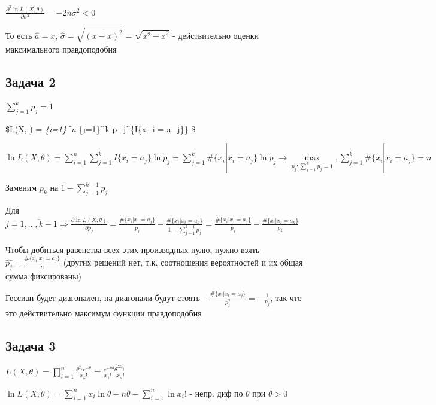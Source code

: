 \documentclass[11pt]{article}
\begin{document}
\(\frac{\partial^2\ln L(X, \theta)}{\partial \sigma^2} = -2n\sigma^2 < 0\)

То есть \(\hat{a} = \overline{x}\),
\(\hat{\sigma} = \sqrt{\overline{(x-\overline{x})^2}} = \sqrt{\overline{x^2} - \overline{x}^2}\)
- действительно оценки максимального правдоподобия

    \hypertarget{ux437ux430ux434ux430ux447ux430-2}{%
\subsection{Задача 2}\label{ux437ux430ux434ux430ux447ux430-2}}

    \(\sum\limits_{j=1}^k p_j = 1\)

\$L(X, \theta) = \prod\limits\emph{\{i=1\}\^{}n
\prod\limits}\{j=1\}\^{}k p\_j\^{}\{I\{x\_i = a\_j\}\} \$

\(\ln L(X, \theta) = \sum\limits_{i=1}^n \sum\limits_{j=1}^k I\{x_i = a_j\}\ln p_j = \sum\limits_{j=1}^k \#\{x_i|x_i = a_j\}\ln p_j \rightarrow \max\limits_{p_j: \sum\limits_{j=1}^k p_j = 1}, \sum\limits_{j=1}^k \#\{x_i|x_i = a_j\} = n\)

    Заменим \(p_k\) на \(1 - \sum\limits_{j=1}^{k-1} p_j\)

Для
\(j=\overline{1,\ldots,k-1} \Rightarrow \frac{\partial\ln L(X, \theta)}{\partial p_j} = \frac{\#\{x_i| x_i = a_j\}}{p_j} - \frac{\#\{x_i| x_i = a_k\}}{1 - \sum\limits_{j=1}^{k-1} p_j} = \frac{\#\{x_i| x_i = a_j\}}{p_j} - \frac{\#\{x_i| x_i = a_k\}}{p_k}\)

Чтобы добиться равенства всех этих производных нулю, нужно взять
\(\hat{p_j} = \frac{\#\{x_i| x_i = a_j\}}{n}\) (других решений нет, т.к.
соотношения вероятностей и их общая сумма фиксированы)

Гессиан будет диагонален, на диагонали будут стоять
\(-\frac{\#\{x_i|x_i = a_j\}}{p_j^2} = -\frac{1}{p_j}\), так что это
действительно максимум функции правдоподобия

    \hypertarget{ux437ux430ux434ux430ux447ux430-3}{%
\subsection{Задача 3}\label{ux437ux430ux434ux430ux447ux430-3}}

    \(L(X, \theta) = \prod\limits_{i=1}^n \frac{\theta^{x_i} e^{-\theta}}{x_k!} = \frac{e^{-n\theta}\theta^{\Sigma x_j}}{x_1!\ldots x_n!}\)

\(\ln L(X, \theta) = \sum\limits_{i=1}^n x_i \ln\theta - n\theta - \sum\limits_{i=1}^n \ln x_i!\)
- непр. диф по \(\theta\) при \(\theta > 0\)
\end{document}

